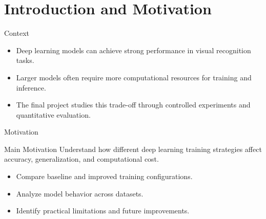 
\section{Introduction and Motivation}

\begin{frame}{Context}
  \small
  \begin{itemize}
    \item Deep learning models can achieve strong performance in visual recognition tasks.
    \item Larger models often require more computational resources for training and inference.
    \item The final project studies this trade-off through controlled experiments and quantitative evaluation.
  \end{itemize}
\end{frame}

\begin{frame}{Motivation}
  \small
  \begin{alertblock}{Main Motivation}
    Understand how different deep learning training strategies affect accuracy, generalization, and computational cost.
  \end{alertblock}

  \vspace{0.3cm}

  \begin{itemize}
    \item Compare baseline and improved training configurations.
    \item Analyze model behavior across datasets.
    \item Identify practical limitations and future improvements.
  \end{itemize}
\end{frame}
